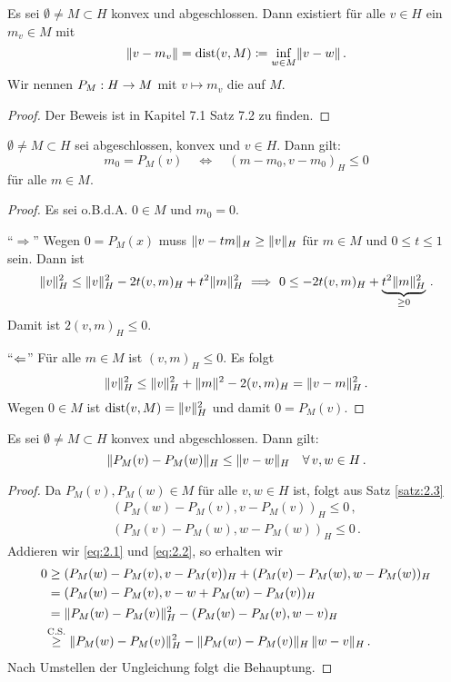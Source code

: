 \begin{satz}\label{satz:2.2}
Es sei $\emptyset\neq M\subset H$ konvex und abgeschlossen. Dann existiert für alle $v\in H$ ein $m_v\in M$ mit
\[ 
  	\lVert v-m_v\rVert=\operatorname{dist}(v,M)\coloneqq \inf_{w\in M}\lVert v-w\rVert\, .
\]
Wir nennen $P_M:H\rightarrow M$ mit $v\mapsto m_v$ die  auf $M$.
\end{satz}

\begin{proof}
Der Beweis ist in \cite{Walker} Kapitel 7.1 Satz 7.2 zu finden.
\end{proof}


\begin{satz}\label{satz:2.3}
$\emptyset\neq M\subset H$ sei abgeschlossen, konvex und $v\in H$. Dann gilt:
\[ 
  	m_0=P_M(v)\quad\Longleftrightarrow\quad (m-m_0, v-m_0)_H\leq0 
\]
für alle $m\in M$.
\end{satz}

\begin{proof}
 Es sei o.B.d.A. $0\in M$ und $m_0=0$.
 
  "`$\Rightarrow$"' Wegen $0=P_M(x)$ muss $\lVert v-tm\rVert_H\geq\lVert v\rVert_H$ für $m\in M$ und $0\leq t\leq1$ sein. Dann ist
\begin{align*}
    	 \lVert v\rVert^2_H\leq\lVert v\rVert^2_H-2t(v, m)_H+t^2\lVert m\rVert^2_H
	\ \Longrightarrow \ 0 \le - 2t (v,m)_H + \underbrace{t^2 \lVert m\rVert_H^2}_{\ge 0} \, .
 \end{align*}
Damit ist $2(v, m)_H\leq0$.
 
 "`$\Leftarrow$"' Für alle $m\in M$ ist $(v, m)_H\leq0$. Es folgt
\[ 
	\lVert v\rVert^2_H\leq\lVert v\rVert^2_H+\lVert m\rVert^2-2(v,m)_H=\lVert v-m\rVert^2_H\, . 
\]
Wegen $0\in M$ ist $\operatorname{dist}(v,M)=\lVert v\rVert^2_H$ und damit $0=P_M(v)$.
\end{proof}


\begin{satz}\label{satz:2.4}
Es sei $\emptyset \not = M \subset H$ konvex und abgeschlossen. Dann gilt:
\[
	\lVert P_M(v)-P_M(w)\rVert_H \le \lVert v-w\rVert_H \quad \forall \, v,w \in H \, .
\]
\end{satz}

\begin{proof}
Da $P_M(v), P_M(w) \in M$ für alle $v,w \in H$ ist, folgt aus Satz \ref{satz:2.3}
\begin{align}\label{eq:2.1}
	(P_M(w)-P_M(v),v-P_M(v))_H  \le 0 \, , \\
	(P_M(v)-P_M(w),w-P_M(w))_H \le 0 \, .\label{eq:2.2}
\end{align}
Addieren wir \eqref{eq:2.1} und \eqref{eq:2.2}, so erhalten wir
\begin{align*}
	0 &\ge (P_M(w)-P_M(v),v-P_M(v))_H + (P_M(v)-P_M(w),w-P_M(w))_H \\
	& = (P_M(w)-P_M(v),v-w+P_M(w)-P_M(v))_H \\
	& = \lVert P_M(w)-P_M(v)\rVert_H^2-(P_M(w)-P_M(v),w-v)_H \\
	&\!\!\!\: \stackrel{\scriptsize \text{C.S.}}\ge \lVert P_M(w)-P_M(v)\rVert_H^2 - \lVert P_M(w)-P_M(v)\rVert_H \, \lVert w-v\rVert_H \, .
\end{align*}
Nach Umstellen der Ungleichung folgt die Behauptung.
\end{proof}


